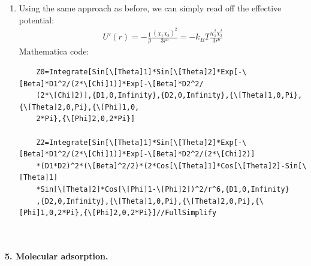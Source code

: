 \documentclass{article}
\theoremstyle{definition}
\newcommand{\be}{\beta}
\newcommand{\f}[2]{\frac{#1}{#2}}
\begin{document}
\begin{enumerate}[label=(\alph*)]
	
	
	\item Using the same approach as before, we can simply read off the effective potential:
	\begin{align*}
	U'(r) = -\f{1}{\be} \f{(\chi_1\chi_2)^2}{3r^6} = \boxed{-k_BT \f{\chi_1^2\chi_2^2}{3r^6}}
	\end{align*}
	Mathematica code:
	\begin{lstlisting}
	Z0=Integrate[Sin[\[Theta]1]*Sin[\[Theta]2]*Exp[-\[Beta]*D1^2/(2*\[Chi]1)]*Exp[-\[Beta]*D2^2/
	(2*\[Chi]2)],{D1,0,Infinity},{D2,0,Infinity},{\[Theta]1,0,Pi},{\[Theta]2,0,Pi},{\[Phi]1,0,
	2*Pi},{\[Phi]2,0,2*Pi}]
	
	Z2=Integrate[Sin[\[Theta]1]*Sin[\[Theta]2]*Exp[-\[Beta]*D1^2/(2*\[Chi]1)]*Exp[-\[Beta]*D2^2/(2*\[Chi]2)]
	*(D1*D2)^2*(\[Beta]^2/2)*(2*Cos[\[Theta]1]*Cos[\[Theta]2]-Sin[\[Theta]1]
	*Sin[\[Theta]2]*Cos[\[Phi]1-\[Phi]2])^2/r^6,{D1,0,Infinity}
	,{D2,0,Infinity},{\[Theta]1,0,Pi},{\[Theta]2,0,Pi},{\[Phi]1,0,2*Pi},{\[Phi]2,0,2*Pi}]//FullSimplify
	
	
	\end{lstlisting}
\end{enumerate}



\noindent \textbf{5. Molecular adsorption.}
\end{document}
